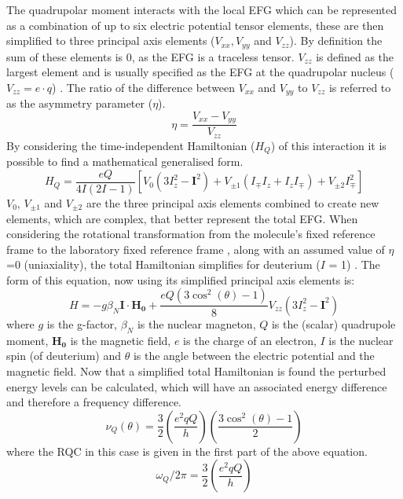 The quadrupolar moment interacts with the local \ac{EFG} which can be represented as a combination of up to six electric potential tensor elements, these are then simplified to three principal axis elements ($V_{xx}, V_{yy}$ and $V_{zz}$). By definition the sum of these elements is 0, as the \ac{EFG} is a traceless tensor. $V_{zz}$ is defined as the largest element and is usually specified as the \ac{EFG} at the quadrupolar nucleus ($V_{zz} = e\cdot q$) \cite{Elliott2021WhatMedia}. The ratio of the difference between $V_{xx}$ and $V_{yy}$ to $V_{zz}$ is referred to as the asymmetry parameter ($\eta$).
\begin{equation}
    \eta = \frac{V_{xx}-V_{yy}}{V_{zz}}
\end{equation}
By considering the time-independent Hamiltonian ($H_Q$) of this interaction it is possible to find a mathematical generalised form.
\begin{equation}
    H_Q = \frac{eQ}{4I(2I-1)}[V_0(3I^2_z-\boldsymbol{I}^2) + V_{\pm1}(I_{\mp}I_z+I_zI_\mp)+V_{\pm2}I^2_\mp]
\end{equation}
$V_0$, $V_{\pm1}$ and $V_{\pm2}$ are the three principal axis elements combined to create new elements, which are complex, that better represent the total \ac{EFG}. When considering the rotational transformation from the molecule's fixed reference frame to the laboratory fixed reference frame \cite{Seelig1977DeuteriumMembranes}, along with an assumed value of $\eta$=0 (uniaxiality), the total Hamiltonian simplifies for deuterium ($I$ = 1)  \cite{Sharf1995DetectionNMR-Spectroscopy}. The form of this equation, now using its simplified principal axis elements is:
\begin{equation}
    H = -g\beta_N\boldsymbol{I}\cdot\boldsymbol{H_0} + \frac{eQ(3\cos^2(\theta)-1)}{8}V_{zz}(3I_z^2-\boldsymbol{I}^2)
\end{equation}
where $g$ is the g-factor, $\beta_N$ is the nuclear magneton, $Q$ is the (scalar) quadrupole moment, $\boldsymbol{H_0}$ is the magnetic field, $e$ is the charge of an electron, $I$ is the nuclear spin (of deuterium) and $\theta$ is the angle between the electric potential and the magnetic field. Now that a simplified total Hamiltonian is found the perturbed energy levels can be calculated, which will have an associated energy difference and therefore a frequency difference.
\begin{equation}
    \nu_Q(\theta) = \frac{3}{2}\left(\frac{e^2qQ}{h}\right)\left(\frac{3\cos^2(\theta)-1}{2}\right)
    \label{eqn:Quad:Angle}
\end{equation}
where the \ac{RQC} in this case is given in the first part of the above equation.
\begin{equation}
    \omega_Q/2\pi = \frac{3}{2}\left(\frac{e^2qQ}{h}\right)
    \label{eqn:Quad:RQC}
\end{equation}

